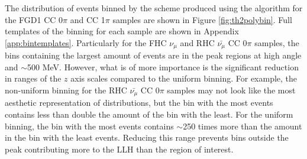 The distribution of events binned by the scheme produced using the algorithm for the FGD1 CC 0$\pi$ and CC 1$\pi$ samples are shown in Figure \ref{fig:th2polybin}. Full templates of the binning for each sample are shown in Appendix \ref{app:bintemplates}. Particularly for the FHC $\nu_{\mu}$ and RHC $\bar{\nu_{\mu}}$ CC 0$\pi$ samples, the bins containing the largest amount of events are in the peak regions at high angle and $\sim$500 MeV. However, what is of more importance is the significant reduction in ranges of the $z$ axis scales compared to the uniform binning. For example, the non-uniform binning for the RHC $\bar{\nu_{\mu}}$ CC 0$\pi$ samples may not look like the most aesthetic representation of distributions, but the bin with the most events contains less than double the amount of the bin with the least. For the uniform binning, the bin with the most events contains $\sim$250 times more than the amount in the bin with the least events. Reducing this range prevents bins outside the peak contributing more to the LLH than the region of interest.

